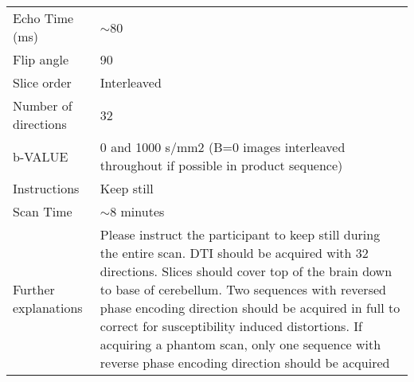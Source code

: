\begin{table}[H]
\begin{tabularx}{\linewidth}{@{} s | X @{}}
Echo Time (ms)            							& $\sim$80                                                                             \\
Flip angle                								& 90                                                                                   \\
Slice order               								& Interleaved                                                                          \\
Number of directions      						& 32                                                                                   \\
b-VALUE                   								& 0 and 1000 s/mm2 (B=0 images interleaved throughout if possible in product sequence) \\
Instructions              							& Keep still                                                                           \\
Scan Time                 								& $\sim$8 minutes                                                                      \\
Further explanations      						& Please instruct the participant to keep still during the entire scan. \ac{DTI} should be acquired with 32 directions. Slices should cover top of the brain down to base of cerebellum. Two sequences with reversed phase encoding direction should be acquired in full to correct for susceptibility induced distortions. If acquiring a phantom scan, only one sequence with reverse phase encoding direction should be acquired                                                                                     
\end{tabularx}
\end{table}


